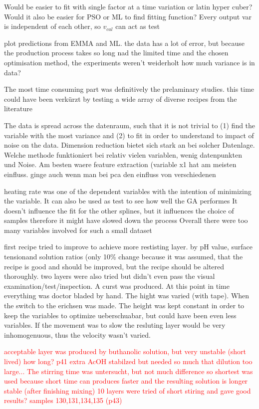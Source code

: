 \documentclass[a4paper]{article}
\newcommand{\td}[1]{\textcolor{red}{#1}}
\begin{document}
Would be easier to fit with single factor at a time variation or latin hyper cuber?
Would it also be easier for PSO or ML to find fitting function?
Every output var is independent of each other, so $v_{cal}$ can act as test 

plot predictions from EMMA and ML.
the data has a lot of error, but because the production process takes so long nad the limited time and the chosen optimisation method, the experiments weren't weiderholt
how much variance is in data? 

The most time consuming part was definitively the prelaminary studies.
this time could have been verkürzt by testing a wide array of diverse recipes from the literature

The data is spread across the datenraum, such that it is not trivial to (1) find the variable with the most variance and (2) to fit in order to understand to impact of noise on the data. 
Dimension reduction bietet sich stark an bei solcher Datenlage. 
Welche methode funktioniert bei relativ vielen variablen, wenig datenpunkten und Noise. 
Am besten waere feature extraction (variable x1 hat am meisten einfluss. ginge auch wenn man bei pca den einfluss von verschiedenen 

heating rate was one of the dependent variables with the intention of minimizing the variable. 
It can also be used as test to see how well the GA performes
It doesn't influence the fit for the other splines, but it influences the choice of samples therefore it might have slowed down the process
Overall there were too many variables involved for such a small dataset

first recipe tried to improve to achieve more restisting layer. by pH value, surface 
tensionand solution ratios (only 10\% change because it was assumed, that the recipe is 
good and should be improved, but the recipe should be altered thoroughly.
two layers were also tried but didn't even pass the visual examination/test/inspection. 
A curst was produced. 
At this point in time everything was doctor bladed by hand. The hight was varied (with tape).
When the switch to the erichsen was made. The height was kept constant in order to keep 
the variables to optimize ueberschuabar, but could have been even less variables.
If the movement was to slow the resluting  layer would be very inhomogenuous, thus the
velocity wasn't varied.

\td{
acceptable layer was produced by buthanolic solution, but very unstable (short lived) how long? p41 
extra AcOH stabilzed but needed so much that dilution too large...
The stirring time was untersucht, but not much difference so shortest was used because 
short time can produces faster and the resulting solution is longer stable 
(after finishing mixing)
10 layers were tried of short stiring and gave good results? samples 130,131,134,135 (p43)
}
\end{document}
